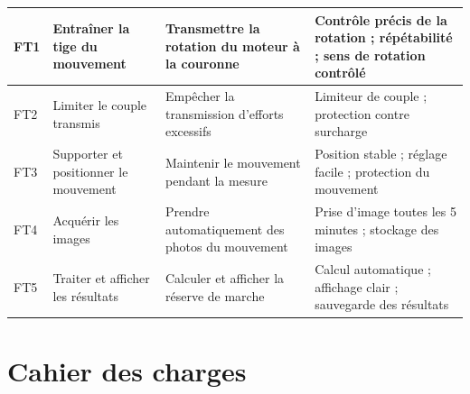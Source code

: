 \begin{landscape}
\begin{longtable}{|>{\raggedright\arraybackslash}p{1.5cm}|p{4cm}|p{6cm}|p{6cm}|}
\bottomrule
\endfoot

FT1 & Entraîner la tige du mouvement & Transmettre la rotation du moteur à la couronne & Contrôle précis de la rotation ; répétabilité ; sens de rotation contrôlé \\
\hline
FT2 & Limiter le couple transmis & Empêcher la transmission d'efforts excessifs & Limiteur de couple ; protection contre surcharge \\
\hline
FT3 & Supporter et positionner le mouvement & Maintenir le mouvement pendant la mesure & Position stable ; réglage facile ; protection du mouvement \\
\hline
FT4 & Acquérir les images & Prendre automatiquement des photos du mouvement & Prise d'image toutes les 5 minutes ; stockage des images \\
\hline
FT5 & Traiter et afficher les résultats & Calculer et afficher la réserve de marche & Calcul automatique ; affichage clair ; sauvegarde des résultats \\
\end{longtable}

\end{landscape}





\section{Cahier des charges}

